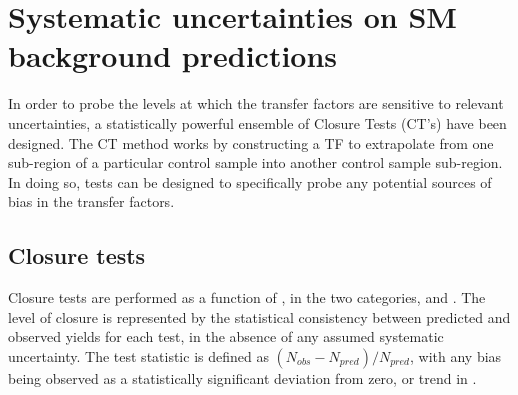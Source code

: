 

\section{Systematic uncertainties on SM background predictions}  %
\label{sec:background_systematics}

In order to probe the levels at which the transfer factors are sensitive to 
relevant uncertainties, a statistically powerful ensemble of Closure Tests
(CT's) have been designed. The CT method works by constructing a TF to
extrapolate from one sub-region of a particular control sample into another 
control sample sub-region. In doing so, tests can be designed to specifically 
probe any potential sources of bias in the transfer factors.

\subsection{Closure tests}
\label{sec:closure_tests}

Closure tests are performed as a function of \HT, in the two \nj categories,
\njlow and \njhigh. The level of closure is represented by the statistical 
consistency between predicted and observed yields for each test, in the absence 
of any assumed systematic uncertainty. The test statistic is defined as $(N_{obs}
- N_{pred}) / N_{pred}$, with any bias being observed as a statistically 
significant deviation from zero, or trend in \HT.


